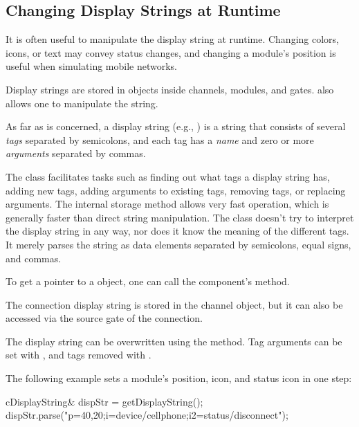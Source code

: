 \subsection{Changing Display Strings at Runtime}
\label{sec:graphics:changing-displaystrings-at-runtime}

It is often useful to manipulate the display string at runtime. Changing colors,
icons, or text may convey status changes, and changing a module's position is
useful when simulating mobile networks.

Display strings are stored in  objects inside channels,
modules, and gates.  also allows one to manipulate the
string.

As far as  is concerned, a display string (e.g.,
) is a string that consists of several \textit{tags}
separated by semicolons, and each tag has a \textit{name} and zero or more
\textit{arguments} separated by commas.

The class facilitates tasks such as finding out what tags a display string has,
adding new tags, adding arguments to existing tags, removing tags, or replacing
arguments. The internal storage method allows very fast operation, which is
generally faster than direct string manipulation. The class doesn't try to
interpret the display string in any way, nor does it know the meaning of the
different tags. It merely parses the string as data elements separated by
semicolons, equal signs, and commas.

To get a pointer to a  object, one can call
the component's  method.

\begin{note}
The connection display string is stored in the channel object, but it
can also be accessed via the source gate of the connection.
\end{note}

The display string can be overwritten using the  method.
Tag arguments can be set with , and tags removed
with .

The following example sets a module's position, icon, and status icon
in one step:

\begin{cpp}
cDisplayString& dispStr = getDisplayString();
dispStr.parse("p=40,20;i=device/cellphone;i2=status/disconnect");
\end{cpp}

